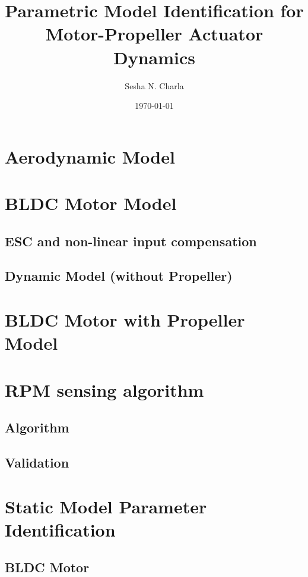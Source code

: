 \documentclass[letterpaper, 11pt]{article}
\title{Parametric Model Identification for Motor-Propeller Actuator Dynamics}
\author{Sesha N. Charla}
\date{\today}
\begin{document}
\maketitle
\tableofcontents

\newpage
\section{Aerodynamic Model}

\newpage
\section{BLDC Motor Model}
\subsection{ESC and non-linear input compensation}

\subsection{Dynamic Model (without Propeller)}
\newpage


\section{BLDC Motor with Propeller Model}
\newpage


\section{RPM sensing algorithm}
\subsection{Algorithm}
\subsection{Validation}
\newpage


\section{Static Model Parameter Identification}
\subsection{BLDC Motor}
\end{document}
